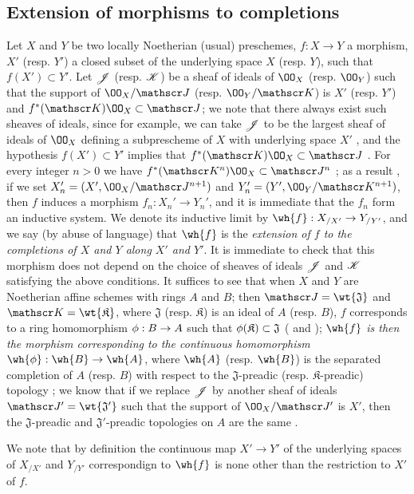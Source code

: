 \subsection{Extension of morphisms to completions}
\label{subsection:1.10.9}

\begin{env}[10.9.1]
\label{1.10.9.1}
Let $X$ and $Y$ be two locally Noetherian (usual) preschemes, $f:X\to Y$ a morphism, $X'$ (resp. $Y'$) a closed subset of the underlying space $X$ (resp. $Y$), such that $f(X')\subset Y'$.
Let $\mathscr{J}$ (resp. $\mathscr{K}$) be a sheaf of ideals of $\OO_X$ (resp. $\OO_Y$) such that the support of $\OO_X/\sh{J}$ (resp. $\OO_Y/\sh{K}$) is $X'$ (resp. $Y'$) and $f^*(\sh{K})\OO_X\subset\sh{J}$; we note that there always exist such sheaves of ideals, since for example, we can take $\mathscr{J}$ to be the largest sheaf of ideals of $\OO_X$ defining a subprescheme of $X$ with underlying space $X'$ , and the hypothesis $f(X')\subset Y'$ implies that $f^*(\sh{K})\OO_X\subset\sh{J}$ .
For every integer $n>0$ we have $f^*(\sh{K}^n)\OO_X\subset\sh{J}^n$ ; as a result , if we set $X_n'=(X',\OO_X/\sh{J}^{n+1})$ and $Y_n'=(Y',\OO_Y/\sh{K}^{n+1})$, then $f$ induces a morphism $f_n:X_n'\to Y_n'$, and it is immediate that the $f_n$ form an inductive system.
We denote its inductive limit  by $\wh{f}:X_{/X'}\to Y_{/Y'}$, and we say (by abuse of language) that $\wh{f}$ is the \emph{extension of $f$ to the completions of $X$ and $Y$ along $X'$ and $Y'$}.
It is immediate to check that this morphism does not depend on the choice of sheaves of ideals $\mathscr{J}$ and $\mathscr{K}$ satisfying the above conditions.
It suffices to see that when $X$ and $Y$ are Noetherian affine schemes with rings $A$ and $B$; then $\sh{J}=\wt{\mathfrak{J}}$ and $\sh{K}=\wt{\mathfrak{K}}$, where $\mathfrak{J}$ (resp. $\mathfrak{K}$) is an ideal of $A$ (resp. $B$), $f$ corresponds to a ring homomorphism $\vphi:B\to A$ such that $\phi(\mathfrak{K})\subset\mathfrak{J}$ ( and ); \emph{$\wh{f}$ is then the morphism corresponding  to the continuous homomorphism $\wh{\vphi}:\wh{B}\to\wh{A}$}, where $\wh{A}$ (resp. $\wh{B}$) is the separated completion of $A$ (resp. $B$) with respect to the $\mathfrak{J}$-preadic (resp. $\mathfrak{K}$-preadic) topology ; we know that if we replace $\mathscr{J}$ by another
sheaf of ideals $\sh{J}'=\wt{\mathfrak{J}'}$ such that the support of $\OO_X/\sh{J}'$ is $X'$, then the $\mathfrak{J}$-preadic and $\mathfrak{J}'$-preadic topologies on $A$ are the same .

We note that by definition the continuous map $X'\to Y'$ of the underlying spaces of $X_{/X'}$ and $Y_{/Y'}$ correspondign to $\wh{f}$ is none other than the restriction to $X'$ of $f$.
\end{env}

